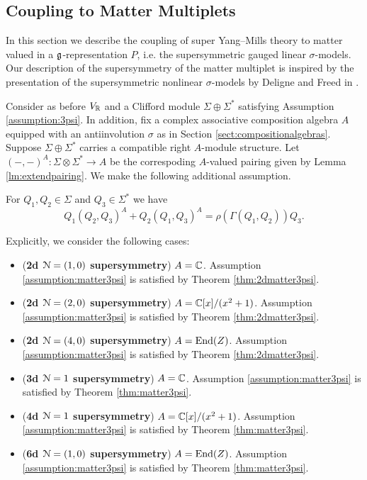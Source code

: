 \documentclass[10pt, oneside]{article}
\begin{document}
\subsection{Coupling to Matter Multiplets}
\label{sect:mattermultipletSUSY}

In this section we describe the coupling of super Yang--Mills theory to matter valued in a $\mathfrak g$-representation $P$, i.e. the supersymmetric gauged linear $\sigma$-models. Our description of the supersymmetry of the matter multiplet is inspired by the presentation of the supersymmetric nonlinear $\sigma$-models by Deligne and Freed in \cite[Chapter 3]{DeligneFreed}.

Consider as before $V_\mathbb R$ and a Clifford module $\Sigma\oplus \Sigma^*$ satisfying Assumption \ref{assumption:3psi}. In addition, fix a complex associative composition algebra $A$ equipped with an antiinvolution $\sigma$ as in Section \ref{sect:compositionalgebras}. Suppose $\Sigma\oplus \Sigma^*$ carries a compatible right $A$-module structure. Let $(-, -)^A\colon \Sigma\otimes \Sigma^*\rightarrow A$ be the correspoding $A$-valued pairing given by Lemma \ref{lm:extendpairing}. We make the following additional assumption.

\begin{assumption}
For $Q_1, Q_2\in\Sigma$ and $Q_3\in\Sigma^*$ we have
\[Q_1(Q_2, Q_3)^A + Q_2(Q_1, Q_3)^A = \rho(\Gamma(Q_1, Q_2))Q_3.\]
\label{assumption:matter3psi}
\end{assumption}

Explicitly, we consider the following cases:
\begin{itemize}
\item (\textbf{2d $\mathcal N=(1, 0)$ supersymmetry}) $A = \mathbb C$. Assumption \ref{assumption:matter3psi} is satisfied by Theorem \ref{thm:2dmatter3psi}.

\item (\textbf{2d $\mathcal N=(2, 0)$ supersymmetry}) $A = \mathbb C[x]/(x^2+1)$. Assumption \ref{assumption:matter3psi} is satisfied by Theorem \ref{thm:2dmatter3psi}.

\item (\textbf{2d $\mathcal N=(4, 0)$ supersymmetry}) $A = \operatorname{End}(Z)$. Assumption \ref{assumption:matter3psi} is satisfied by Theorem \ref{thm:2dmatter3psi}.

\item (\textbf{3d $\mathcal N=1$ supersymmetry}) $A = \mathbb C$. Assumption \ref{assumption:matter3psi} is satisfied by Theorem \ref{thm:matter3psi}.

\item (\textbf{4d $\mathcal N=1$ supersymmetry}) $A = \mathbb C[x]/(x^2+1)$. Assumption \ref{assumption:matter3psi} is satisfied by Theorem \ref{thm:matter3psi}.

\item (\textbf{6d $\mathcal N=(1, 0)$ supersymmetry}) $A = \operatorname{End}(Z)$. Assumption \ref{assumption:matter3psi} is satisfied by Theorem \ref{thm:matter3psi}.
\end{itemize}
\end{document}
